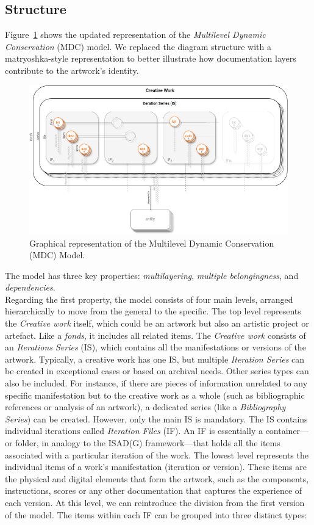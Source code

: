 \subsection{Structure}
Figure~\ref{fig:c3-mdc} shows the updated representation of the \textit{Multilevel Dynamic Conservation} (MDC) model. We replaced the diagram structure with a matryoshka-style representation to better illustrate how documentation layers contribute to the artwork's identity.
\begin{figure}[!h]
    \centering
    \includegraphics[width=\linewidth]{chapters/3-mdc_model-reactivation_workflow-instruction_template/image/graph03-mdc.png}
    \caption{Graphical representation of the Multilevel Dynamic Conservation (MDC) Model.}
    \label{fig:c3-mdc}
\end{figure} 
The model has three key properties: \textit{multilayering}, \textit{multiple belongingness}, and \textit{dependencies}.\\
Regarding the first property, the model consists of four main levels, arranged hierarchically to move from the general to the specific. The top level represents the \textit{Creative work} itself, which could be an artwork but also an artistic project or artefact. Like a \textit{fonds}, it includes all related items. The \textit{Creative work} consists of an \textit{Iterations Series} (IS), which contains all the manifestations or versions of the artwork. Typically, a creative work has one IS, but multiple \textit{Iteration Series} can be created in exceptional cases or based on archival needs. Other series types can also be included. For instance, if there are pieces of information unrelated to any specific manifestation but to the creative work as a whole (such as bibliographic references or analysis of an artwork), a dedicated series (like a \textit{Bibliography Series}) can be created. However, only the main IS is mandatory. The IS contains individual iterations called \textit{Iteration Files} (IF). An IF is essentially a container—or folder, in analogy to the ISAD(G) framework—that holds all the items associated with a particular iteration of the work. The lowest level represents the individual items of a work's manifestation (iteration or version). These items are the physical and digital elements that form the artwork, such as the components, instructions, scores or any other documentation that captures the experience of each version. At this level, we can reintroduce the division from the first version of the model. The items within each IF can be grouped into three distinct types:
